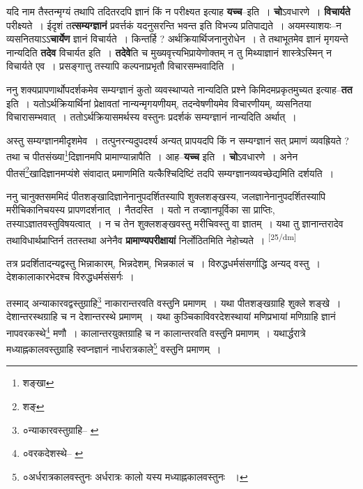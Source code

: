 \documentclass[article,12pt,a4paper]{memoir}
\begin{document}
	  \pstart यदि नाम तैस्तन्मृग्यं तथापि तदितरदपि ज्ञानं किं न परीक्ष्यत इत्याह \textbf{यच्च}--इति । \textbf{चो}ऽवधारणे । \textbf{विचार्यते} परीक्ष्यते । ईदृशं त\textbf{त्सम्यग्ज्ञानं} प्रवर्त्तकं यदनुसरन्ति भवन्त इति विभज्य प्रतिपाद्यते । अयमस्याशयः--न व्यसनितयाऽऽ\textbf{चार्येण} ज्ञानं विचार्यते । किन्तर्हि ? अर्थक्रियार्थिजनानुरोधेन । ते तथाभूतमेव ज्ञानं मृगयन्ते नान्यदिति \textbf{तदेव} विचार्यत इति । \textbf{तदेवे}ति च मुख्यवृत्त्यभिप्रायेणोक्तम् न तु मिथ्याज्ञानं शास्त्रेऽस्मिन् न विचार्यते एव । प्रसङ्गात्तु तस्यापि कल्पनाप्रभृतौ विचारसम्भवादिति ।
	\pend
      

	  \pstart ननु शक्यप्रापणार्थोपदर्शकमेव सम्यग्ज्ञानं कुतो व्यवस्थाप्यते नान्यदिति प्रश्ने किमिदमप्रकृतमुच्यत इत्याह--\textbf{तत} इति । यतोऽर्थक्रियार्थिनां प्रेक्षावतां नान्यन्मृगयणीयम्, तदन्वेषणीयमेव विचारणीयम्, व्यसनितया विचारासम्भवात् । ततोऽर्थक्रियासमर्थस्य वस्तुनः प्रदर्शकं सम्यग्ज्ञानं नान्यदिति अर्थात् ।
	\pend
      

	  \pstart अस्तु सम्यग्ज्ञानमीदृशमेव । तत्पुनरन्यदुपदर्श्य अन्यत् प्रापयदपि किं न सम्यग्ज्ञानं सत् प्रमाणं व्यवह्रियते ? तथा च पीतसंख्या\footnote{शङ्खा}दिज्ञानमपि प्रामाण्यान्नापैति । आह--\textbf{यच्च} इति । \textbf{चो}ऽवधारणे । अनेन पीतसं\footnote{शङ्}खादिज्ञानमप्यंशे संवादात् प्रमाणमिति यत्कैश्चिदिष्टिं तदपि सम्यग्ज्ञानव्यवच्छेद्यमिति दर्शयति ।
	\pend
      

	  \pstart ननु चानुक्तसममिदं पीतशङ्खादिज्ञानेनानुपदर्शितस्यापि शुक्लशङ्खस्य, जलज्ञानेनानुपदर्शितस्यापि मरीचिकानिचयस्य प्रापणदर्शनात् । नैतदस्ति । यतो न तज्ज्ञानपूर्विका सा प्राप्तिः, तस्याऽज्ञातवस्तुविषयत्वात् । न च तेन शुक्लशङ्खवस्तु मरीचिवस्तु वा ज्ञातम् । यथा तु ज्ञानान्तरादेव तथाविधार्थप्राप्तिर्न ततस्तथा अनेनैव \textbf{प्रामाण्यपरीक्षायां} निर्लोठितमिति नेहोच्यते ।
	\pend
      \leavevmode\textsuperscript{\rmlatinfont\tiny [25/dm]}

	  \pstart तत्र प्रदर्शितादन्यद्वस्तु भिन्नाकारम्, भिन्नदेशम्, भिन्नकालं च । विरुद्धधर्मसंसर्गाद्धि अन्यद् वस्तु । देशकालाकारभेदश्च विरुद्धधर्मसंसर्गः ।
	\pend
       

	  \pstart तस्माद् अन्याकारवद्वस्तुग्राहि\footnote{०न्याकारवस्तुग्राहि--\cite{dp-msB} \cite{dp-msC} \cite{dp-msD}} नाकारान्तरवति वस्तुनि प्रमाणम् । यथा पीतशङ्खग्राहि शुक्ले शङ्खे । देशान्तरस्थग्राहि च न देशान्तरस्थे प्रमाणम् । यथा कुञ्चिकाविवरदेशस्थायां मणिप्रभायां मणिग्राहि ज्ञानं नापवरकस्थे\footnote{०वरकदेशस्थे--\cite{dp-msA} \cite{dp-msB} \cite{dp-msC} \cite{dp-msD} \cite{dp-edP} \cite{dp-edE} \cite{dp-edH} \cite{dp-edN}} मणौ । कालान्तरयुक्तग्राहि च न कालान्तरवति वस्तुनि प्रमाणम् । यथार्द्धरात्रे मध्याह्नकालवस्तुग्राहि स्वप्नज्ञानं नार्धरात्रकाले\footnote{०अर्धरात्रकालवस्तुनः \cite{dp-edN} अर्धरात्रः कालो यस्य मध्याह्नकालवस्तुनः \cite{dp-msD-n} ।} वस्तुनि प्रमाणम् ।
	\pend
      
\end{document}

